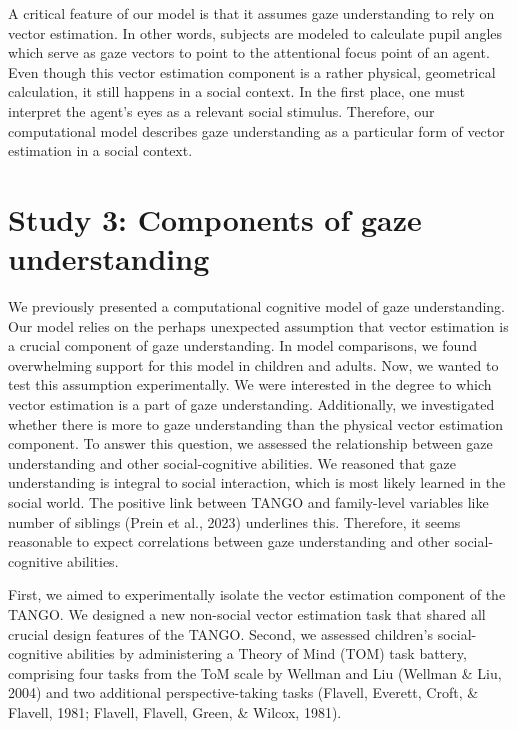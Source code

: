 \documentclass[
  man,mask,floatsintext]{apa6}
\begin{document}
A critical feature of our model is that it assumes gaze understanding to rely on vector estimation. In other words, subjects are modeled to calculate pupil angles which serve as gaze vectors to point to the attentional focus point of an agent. Even though this vector estimation component is a rather physical, geometrical calculation, it still happens in a social context. In the first place, one must interpret the agent's eyes as a relevant social stimulus. Therefore, our computational model describes gaze understanding as a particular form of vector estimation in a social context.

\hypertarget{study-3-components-of-gaze-understanding}{%
\section{Study 3: Components of gaze understanding}\label{study-3-components-of-gaze-understanding}}

We previously presented a computational cognitive model of gaze understanding. Our model relies on the perhaps unexpected assumption that vector estimation is a crucial component of gaze understanding. In model comparisons, we found overwhelming support for this model in children and adults. Now, we wanted to test this assumption experimentally. We were interested in the degree to which vector estimation is a part of gaze understanding. Additionally, we investigated whether there is more to gaze understanding than the physical vector estimation component. To answer this question, we assessed the relationship between gaze understanding and other social-cognitive abilities. We reasoned that gaze understanding is integral to social interaction, which is most likely learned in the social world. The positive link between TANGO and family-level variables like number of siblings (Prein et al., 2023) underlines this. Therefore, it seems reasonable to expect correlations between gaze understanding and other social-cognitive abilities.

First, we aimed to experimentally isolate the vector estimation component of the TANGO. We designed a new non-social vector estimation task that shared all crucial design features of the TANGO. Second, we assessed children's social-cognitive abilities by administering a Theory of Mind (TOM) task battery, comprising four tasks from the ToM scale by Wellman and Liu (Wellman \& Liu, 2004) and two additional perspective-taking tasks (Flavell, Everett, Croft, \& Flavell, 1981; Flavell, Flavell, Green, \& Wilcox, 1981).
\end{document}
